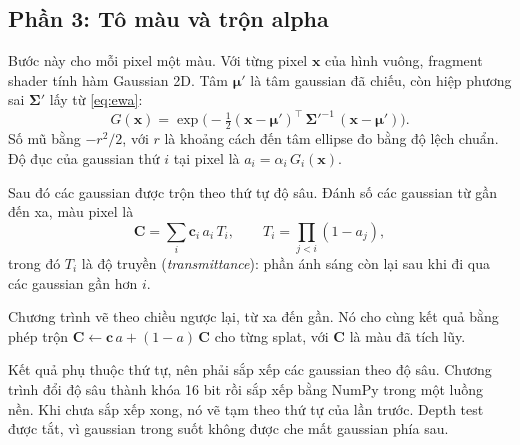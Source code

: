 \documentclass[9pt,twocolumn,a4paper]{extarticle}
\newcommand{\Sig}{\symbf{\Sigma}}
\begin{document}
\par\noindent{}\par\vspace{3pt}

\par\noindent{}\par\vspace{3pt}

\subsection{Phần 3: Tô màu và trộn alpha}
\label{sec:blend}
Bước này cho mỗi pixel một màu. Với từng pixel $\mathbf{x}$ của hình vuông, fragment shader tính hàm Gaussian 2D. Tâm $\symbf{\mu}'$ là tâm gaussian đã chiếu, còn hiệp phương sai $\Sig'$ lấy từ \eqref{eq:ewa}:
\begin{equation}
G(\mathbf{x})=\exp\!\Big(-\tfrac12(\mathbf{x}-\symbf{\mu}')^{\top}\,\Sig'^{-1}\,(\mathbf{x}-\symbf{\mu}')\Big).
\label{eq:gauss}
\end{equation}
Số mũ bằng $-r^2/2$, với $r$ là khoảng cách đến tâm ellipse đo bằng độ lệch chuẩn. Độ đục của gaussian thứ $i$ tại pixel là $a_i=\alpha_i\,G_i(\mathbf{x})$.

\par\noindent{}\par\vspace{3pt}

Sau đó các gaussian được trộn theo thứ tự độ sâu. Đánh số các gaussian từ gần đến xa, màu pixel là
\begin{equation}
\mathbf{C}=\sum_{i}\mathbf{c}_i\,a_i\,T_i,\qquad
T_i=\prod_{j<i}(1-a_j),
\label{eq:over}
\end{equation}
trong đó $T_i$ là độ truyền (\emph{transmittance}): phần ánh sáng còn lại sau khi đi qua các gaussian gần hơn $i$.

Chương trình vẽ theo chiều ngược lại, từ xa đến gần. Nó cho cùng kết quả bằng phép trộn $\mathbf{C}\leftarrow\mathbf{c}\,a+(1-a)\,\mathbf{C}$ cho từng splat, với $\mathbf{C}$ là màu đã tích lũy.

Kết quả phụ thuộc thứ tự, nên phải sắp xếp các gaussian theo độ sâu. Chương trình đổi độ sâu thành khóa 16 bit rồi sắp xếp bằng NumPy trong một luồng nền. Khi chưa sắp xếp xong, nó vẽ tạm theo thứ tự của lần trước. Depth test được tắt, vì gaussian trong suốt không được che mất gaussian phía sau.
\end{document}
